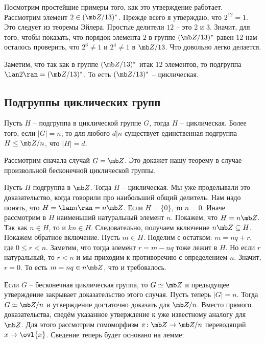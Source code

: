 Посмотрим простейшие примеры того, как это утверждение работает. Рассмотрим элемент $2\in (\mb Z/13)^*$. Прежде всего я утверждаю, что $2^{12}=1$. Это следует из теоремы Эйлера. Простые делители $12$ -- это $2$ и $3$. Значит, для того, чтобы показать, что порядок элемента $2$ в группе $(\mb Z/13)^*$ равен 12 нам осталось проверить, что $2^{6}\neq 1$ и $2^4\neq 1$ в $\mb Z/13$. Что довольно легко делается.

Заметим, что так как в группе $(\mb Z/13)^*$ итак 12 элементов, то подгруппа $\lan 2\ran =(\mb Z/13)^*$. То есть $(\mb Z/13)^*$ -- циклическая.










\subsection{Подгруппы циклических групп}



\thrm Пусть $H$ -- подгруппа в циклической группе $G$, тогда $H$ -- циклическая. Более того, если $|G|=n$, то для любого $d|n$ существует единственная подгруппа $H\leq \mb Z/n$, что $|H|=d$. 
\ethrm
\proof

Рассмотрим сначала случай $G=\mb Z$. Это докажет нашу теорему в случае произвольной бесконечной циклической группы.

\lm Пусть $H$ подгруппа в $\mb Z$. Тогда $H$ -- циклическая.
\elm
\proof Мы уже проделывали это доказательство, когда говорили про наибольший общий делитель. Нам надо понять, что $H=\lan n\ran =n\mb Z$. Если $H=\{0\}$, то $n=0$. Иначе рассмотрим в $H$ наименьший натуральный элемент $n$. Покажем, что $H=n\mb Z$. Так как $n \in H$, то и $kn \in H$. Следовательно, получаем включение $n\mb Z \subseteq H$. Покажем обратное включение. Пусть $m\in H$. Поделим с остатком: $m=nq+r$, где $0\leq r<n$. Заметим, что тогда элемент $r=m-nq$ тоже лежит в $H$. Но если $r$ натуральный, то $r<n$ и мы приходим к противоречию с определением $n$. Значит,  $r=0$. То есть $m=nq \in n \mb Z$, что и требовалось. 
\endproof

Если $G$ -- бесконечная циклическая группа, то $G \simeq \mb Z$ и предыдущее утверждение закрывает доказательство этого случая. Пусть теперь $|G|=n$. Тогда $G\simeq \mb Z/n$ и утверждение достаточно доказать для $\mb Z/n$. Вместо прямого доказательства, сведём указанное утверждение к уже известному аналогу для $\mb Z$. Для этого рассмотрим гомоморфизм $\pi\colon \mb Z \to \mb Z/n$ переводящий $x\to \ovl{x}$. Сведение теперь будет основано на лемме:

